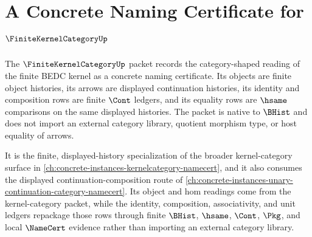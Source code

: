 \chapter{A Concrete Naming Certificate for $\FiniteKernelCategoryUp$}
\label{ch:concrete-instances-finitekernelcategory-namecert}

The $\FiniteKernelCategoryUp$ packet records the category-shaped reading of the finite BEDC kernel as a concrete naming certificate. Its objects are finite object histories, its arrows are displayed continuation histories, its identity and composition rows are finite $\Cont$ ledgers, and its equality rows are $\hsame$ comparisons on the same displayed histories. The packet is native to $\BHist$ and does not import an external category library, quotient morphism type, or host equality of arrows.

It is the finite, displayed-history specialization of the broader kernel-category surface in \autoref{ch:concrete-instances-kernelcategory-namecert}, and it also consumes the displayed continuation-composition route of \autoref{ch:concrete-instances-unary-continuation-category-namecert}. Its object and hom readings come from the kernel-category packet, while the identity, composition, associativity, and unit ledgers repackage those rows through finite $\BHist$, $\hsame$, $\Cont$, $\Pkg$, and local $\NameCert$ evidence rather than importing an external category library.

